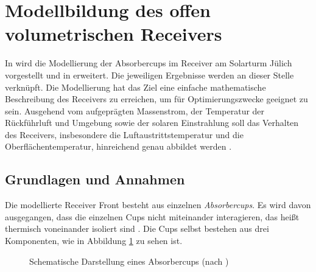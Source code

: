 \section{Modellbildung des offen volumetrischen Receivers} \label{sec_Ausgangszustand}
In \cite[S.90ff]{DissGall} wird die Modellierung der Absorbercups im Receiver am Solarturm Jülich vorgestellt und in \cite{IdingSolarPaces} erweitert.
Die jeweiligen Ergebnisse werden an dieser Stelle verknüpft.
Die Modellierung hat das Ziel eine einfache mathematische Beschreibung des Receivers zu erreichen, um für Optimierungszwecke geeignet zu sein.
Ausgehend vom aufgeprägten Massenstrom, der Temperatur der Rückführluft und Umgebung sowie der solaren Einstrahlung soll das Verhalten des Receivers, insbesondere die Luftaustrittstemperatur und die Oberflächentemperatur, hinreichend genau abbildet werden \cite[S.90]{DissGall}.

\subsection{Grundlagen und Annahmen} \label{subsec_GrundlagenAnnahmen}
Die modellierte Receiver Front besteht aus einzelnen \textit{Absorbercups}.
Es wird davon ausgegangen, dass die einzelnen Cups nicht miteinander interagieren, das heißt thermisch voneinander isoliert sind \cite[S.91]{DissGall}.
Die Cups selbst bestehen aus drei Komponenten, wie in Abbildung \ref{fig_AufbauCup} zu sehen ist.

\begin{figure}[h!]
    \centering
    \setlength{\fboxsep}{1pt}
    \setlength{\fboxrule}{1pt}
    \caption[Schematische Darstellung eines Absorbercups]{Schematische Darstellung eines Absorbercups (nach \cite[S.90]{DissGall})}
    \label{fig_AufbauCup}
\end{figure}

